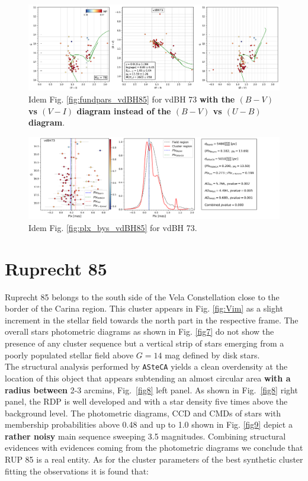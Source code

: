 \documentclass[referee]{aa}
\begin{document}
\begin{figure}[ht]
    \centering
    \includegraphics[width=\hsize]{../figs/cmds_vdBH73.png}
\caption{Idem Fig. \ref{fig:fundpars_vdBH85} for vdBH 73 \textbf{with the $(B-V)$ vs
$(V-I)$ diagram instead of the $(B-V)$ vs $(U-B)$ diagram}.}
    \label{fig:fundpars_vdBH73}
\end{figure}

\begin{figure}[ht]
    \centering
    \includegraphics[width=\hsize]{../figs/plx_vdBH73.png}
\caption{Idem Fig. \ref{fig:plx_bys_vdBH85} for vdBH 73.}
\label{fig:plx_bys_vdBH73}
\end{figure}




\section{Ruprecht 85}

Ruprecht 85 belongs to the south side of the Vela Constellation close to the
border of the Carina region. This cluster appears in Fig. \ref{fig:Vim} as a
slight increment in the stellar field towards the north part in the respective
frame.
The overall stars photometric diagrams as shown in Fig. \ref{fig7} do not show
the presence of any cluster sequence but a vertical strip of stars emerging from
a poorly populated stellar field above $G=14$ mag defined by disk stars.\\

The structural analysis performed by \texttt{ASteCA} yields a clean overdensity
at the location of this object that appears subtending an almost circular area
\textbf{with a radius between} 2-3 arcmins, Fig.~\ref{fig8} left panel.
As shown in Fig.~\ref{fig8} right panel, the RDP is well developed
and with a star density five times above the background level. The
photometric diagrams, CCD and CMDs of stars with membership probabilities above
0.48 and up to 1.0 shown in Fig. \ref{fig9} depict a \textbf{rather noisy} main
sequence sweeping 3.5 magnitudes.
Combining structural evidences with evidences coming from the photometric
diagrams we conclude that RUP 85 is a real entity. As for the cluster
parameters of the best synthetic cluster fitting the observations it is found
that:
\end{document}
